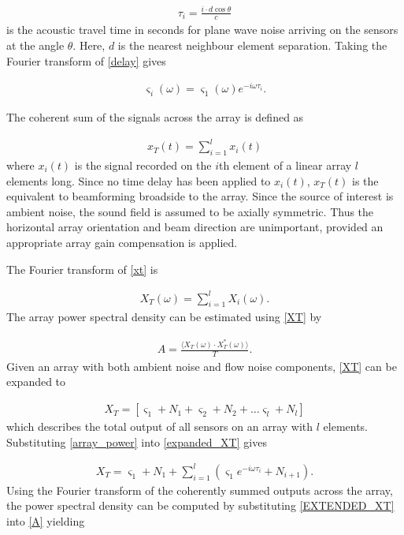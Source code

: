 \documentclass[12pt,journal,onecolumn]{IEEEtran}
\begin{document}
\begin{align}
\tau_i = \frac{i\cdot d \cos\theta}{c}
\label{tau}
\end{align}
is the acoustic travel time in seconds for plane wave noise arriving on the sensors at the angle $\theta$. Here, $d$ is the nearest neighbour element separation.  Taking the Fourier transform of \eqref{delay} gives 

\begin{align}
\varsigma_i(\omega) = \varsigma_1(\omega) e^{-i \omega \tau_{i}}.
\label{array_power}
\end{align}

The coherent sum of the signals across the array is defined as 

\begin{align}
x_T(t) = \sum_{i = 1}^{l} x_i(t)
\label{xt}
\end{align}
where $x_i(t)$ is the signal recorded on the $i$th element of a linear array $l$ elements long. Since no time delay has been applied to $x_i(t)$, $x_T(t)$ is the equivalent to beamforming broadside to the array. Since the source of interest is ambient noise, the sound field is assumed to be axially symmetric. Thus the horizontal array orientation and beam direction are unimportant, provided an appropriate array gain compensation is applied. 

The Fourier transform of \eqref{xt} is 

\begin{align}
X_T(\omega) = \sum_{i = 1}^{l} X_i(\omega).
\label{XT}
\end{align}
The array power spectral density can be estimated using \eqref{XT} by

\begin{align}
A = \frac{\langle X_T(\omega) \cdot X^*_T(\omega) \rangle}{T}.
\label{A}
\end{align}
Given an array with both ambient noise and flow noise components, \eqref{XT} can be expanded to

\begin{align}
X_T = [ \varsigma_1 + N_1 + \varsigma_2 + N_2 + \dots \varsigma_l + N_l ]
\label{expanded_XT}
\end{align}
which describes the total output of all sensors on an array with $l$ elements. Substituting \eqref{array_power} into \eqref{expanded_XT} gives

\begin{align}
X_T = \varsigma_1 + N_1 + \sum_{i=1}^{l}( \varsigma_1 e^{-i \omega \tau_{i}} + N_{i+1}).
\label{EXTENDED_XT}
\end{align}
Using the Fourier transform of the coherently summed outputs across the array, the power spectral density can be computed by substituting \eqref{EXTENDED_XT} into \eqref{A} yielding
\end{document}
